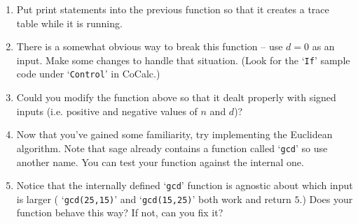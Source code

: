 \documentclass{amsart}
\begin{document}
\begin{enumerate}
{\tt division\_alg(23,7)}

(but pick your own inputs.)

\vfill

\item Put print statements into the previous function so that it creates a trace table while it is running.

\vfill

\item There is a somewhat obvious way to break this function -- use $d=0$ as an input. Make some changes to handle that situation.  (Look for the `{\tt If}' sample code under `{\tt Control}' in CoCalc.)

\vfill

\item Could you modify the function above so that it dealt properly with signed inputs (i.e. positive and negative values of $n$ and $d$)?

\vfill

\item Now that you've gained some familiarity, try implementing the Euclidean algorithm.  Note that sage already contains a function called `{\tt gcd}' so use another name.  You can test your function against the internal one.

\vfill

\item Notice that the internally defined `{\tt gcd}' function is agnostic about which input is larger ( `{\tt gcd(25,15)}' and `{\tt gcd(15,25)}' both work and return $5$.)  Does your function behave this way?  If not, can you fix it?

\vfill


\end{enumerate}
\end{document}
